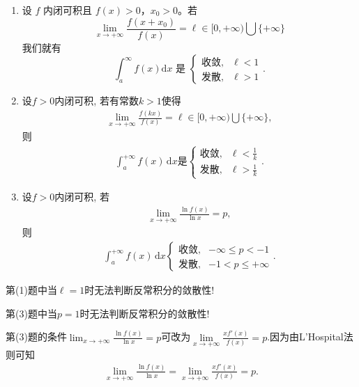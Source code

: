 \documentclass[../../main.tex]{subfiles}
\begin{document}
\begin{example}
\begin{enumerate}[(1)]
\item 设 \( f \) 内闭可积且 \( f(x) > 0 \)，\( x_0 > 0 \)。若
\[
\lim_{x \to +\infty} \frac{f(x + x_0)}{f(x)} = \ell \in [0, +\infty) \bigcup \{ +\infty \}
\]
我们就有
\[
\int_{a}^{\infty} f(x) \mathrm{d}x \text{ 是 } 
\begin{cases} 
\text{收敛,} & \ell < 1 \\
\text{发散,} & \ell > 1 
\end{cases}.
\]

\item 设$f>0$内闭可积, 若有常数$k>1$使得
\begin{align*}
\lim_{x \to +\infty} \frac{f(kx)}{f(x)} = \ell \in [0, +\infty) \bigcup \{+\infty\},
\end{align*}
则
\begin{align*}
\int_a^{+\infty} f(x) \, \mathrm{d}x \text{是} 
\begin{cases} 
\text{收敛}, & \ell < \tfrac{1}{k} \\
\text{发散}, & \ell > \tfrac{1}{k}
\end{cases}.
\end{align*}

\item 设$f>0$内闭可积, 若
\begin{align*}
\lim_{x \to +\infty} \frac{\ln f(x)}{\ln x} = p,
\end{align*}
则
\begin{align*}
\int_a^{+\infty} f(x) \, \mathrm{d}x 
\begin{cases} 
\text{收敛}, & -\infty \leqslant p < -1 \\
\text{发散}, & -1 < p \leqslant +\infty
\end{cases}.
\end{align*}
\end{enumerate}
\end{example}
\begin{remark}
第(1)题中当$\ell =1$时无法判断反常积分的敛散性!

第(3)题中当$p =1$时无法判断反常积分的敛散性!
\end{remark}
\begin{remark}
第(3)题的条件$\lim_{x \to +\infty} \frac{\ln f(x)}{\ln x} = p$可改为$\underset{x\rightarrow +\infty}{\lim}\frac{xf' \left( x \right)}{f\left( x \right)}=p$.因为由L'Hospital法则可知
\begin{align*}
\lim_{x\rightarrow +\infty} \frac{\ln f(x)}{\ln x}=\underset{x\rightarrow +\infty}{\lim}\frac{xf' \left( x \right)}{f\left( x \right)}=p.
\end{align*}
\end{remark}
\end{document}
